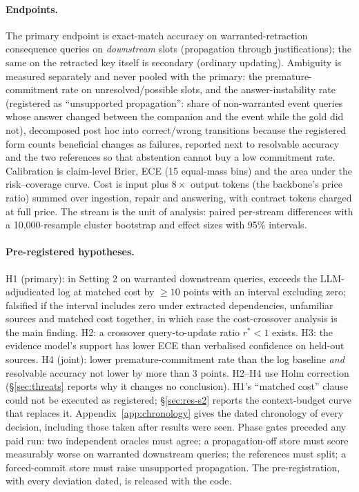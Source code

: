 \paragraph{Endpoints.} The primary endpoint is exact-match accuracy on warranted-retraction consequence queries on \emph{downstream} slots (propagation through justifications); the same on the retracted key itself is secondary (ordinary updating). Ambiguity is measured separately and never pooled with the primary: the premature-commitment rate on unresolved/possible slots, and the answer-instability rate (registered as ``unsupported propagation'': share of non-warranted event queries whose answer changed between the companion and the event while the gold did not), decomposed post hoc into correct/wrong transitions because the registered form counts beneficial changes as failures, reported next to resolvable accuracy and the two references so that abstention cannot buy a low commitment rate. Calibration is claim-level Brier, ECE (15 equal-mass bins) and the area under the risk--coverage curve. Cost is input plus $8\times$ output tokens (the backbone's price ratio) summed over ingestion, repair and answering, with contract tokens charged at full price. The stream is the unit of analysis: paired per-stream differences with a 10{,}000-resample cluster bootstrap and effect sizes with 95\% intervals.

\paragraph{Pre-registered hypotheses.} H1 (primary): in Setting 2 on warranted downstream queries, \pal{} exceeds the LLM-adjudicated log at matched cost by $\geq 10$ points with an interval excluding zero; falsified if the interval includes zero under extracted dependencies, unfamiliar sources and matched cost together, in which case the cost-crossover analysis is the main finding. H2: a crossover query-to-update ratio $r^*<1$ exists. H3: the evidence model's support has lower ECE than verbalised confidence on held-out sources. H4 (joint): lower premature-commitment rate than the log baseline \emph{and} resolvable accuracy not lower by more than 3 points. H2--H4 use Holm correction (\S\ref{sec:threats} reports why it changes no conclusion). H1's ``matched cost'' clause could not be executed as registered; \S\ref{sec:res-s2} reports the context-budget curve that replaces it. Appendix~\ref{app:chronology} gives the dated chronology of every decision, including those taken after results were seen. Phase gates preceded any paid run: two independent oracles must agree; a propagation-off store must score measurably worse on warranted downstream queries; the references must split; a forced-commit store must raise unsupported propagation. The pre-registration, with every deviation dated, is released with the code.

